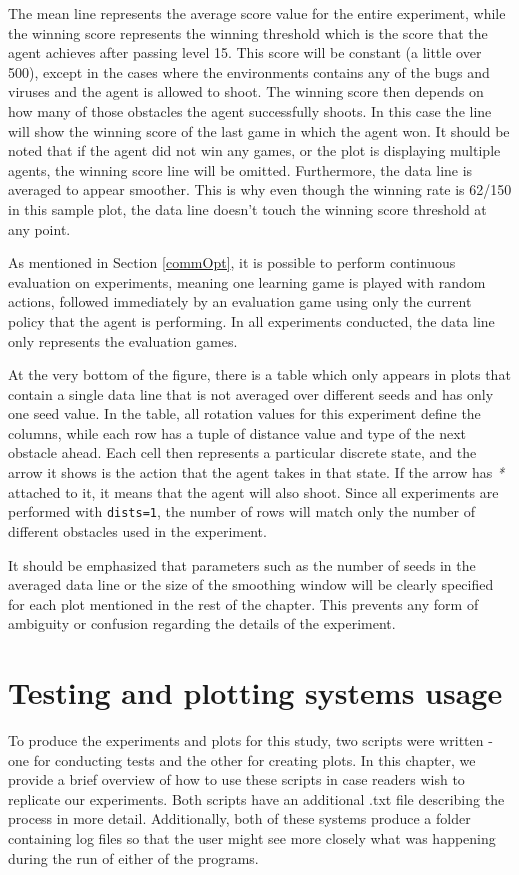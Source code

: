 The mean line represents the average score value for the entire experiment, while the winning score represents the winning threshold which is the score that the agent achieves after passing level 15. This score will be constant (a little over 500), except in the cases where the environments contains any of the bugs and viruses and the agent is allowed to shoot. The winning score then depends on how many of those obstacles the agent successfully shoots. In this case the line will show the winning score of the last game in which the agent won. It should be noted that if the agent did not win any games, or the plot is displaying multiple agents, the winning score line will be omitted. Furthermore, the data line is averaged to appear smoother. This is why even though the winning rate is 62/150 in this sample plot, the data line doesn't touch the winning score threshold at any point.

As mentioned in Section \ref{commOpt}, it is possible to perform continuous evaluation on experiments, meaning one learning game is played with random actions, followed immediately by an evaluation game using only the current policy that the agent is performing. In all experiments conducted, the data line only represents the evaluation games.

At the very bottom of the figure, there is a table which only appears in plots that contain a single data line that is not averaged over different seeds and has only one seed value. In the table, all rotation values for this experiment define the columns, while each row has a tuple of distance value and type of the next obstacle ahead. Each cell then represents a particular discrete state, and the arrow it shows is the action that the agent takes in that state. If the arrow has \textit{*} attached to it, it means that the agent will also shoot. Since all experiments are performed with \texttt{dists=1}, the number of rows will match only the number of different obstacles used in the experiment.

It should be emphasized that parameters such as the number of seeds in the averaged data line or the size of the smoothing window will be clearly specified for each plot mentioned in the rest of the chapter. This prevents any form of ambiguity or confusion regarding the details of the experiment.

\section{Testing and plotting systems usage}
To produce the experiments and plots for this study, two scripts were written - one for conducting tests and the other for creating plots.  In this chapter, we provide a brief overview of how to use these scripts in case readers wish to replicate our experiments. Both scripts have an additional .txt file describing the process in more detail. Additionally, both of these systems produce a folder containing log files so that the user might see more closely what was happening during the run of either of the programs.

